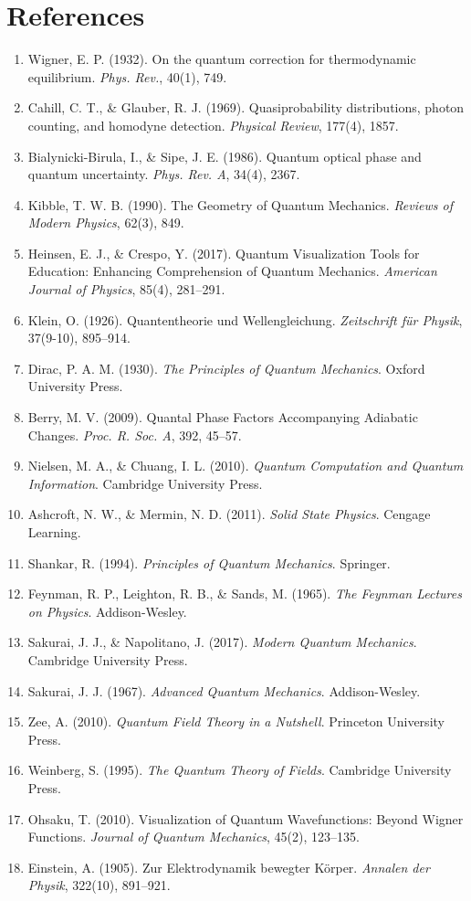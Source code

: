 \documentclass[12pt]{article}
\begin{document}
\section*{References}
\begin{enumerate}
    \item Wigner, E. P. (1932). On the quantum correction for thermodynamic equilibrium. \textit{Phys. Rev.}, 40(1), 749.
    \item Cahill, C. T., \& Glauber, R. J. (1969). Quasiprobability distributions, photon counting, and homodyne detection. \textit{Physical Review}, 177(4), 1857.
    \item Bialynicki-Birula, I., \& Sipe, J. E. (1986). Quantum optical phase and quantum uncertainty. \textit{Phys. Rev. A}, 34(4), 2367.
    \item Kibble, T. W. B. (1990). The Geometry of Quantum Mechanics. \textit{Reviews of Modern Physics}, 62(3), 849.
    \item Heinsen, E. J., \& Crespo, Y. (2017). Quantum Visualization Tools for Education: Enhancing Comprehension of Quantum Mechanics. \textit{American Journal of Physics}, 85(4), 281–291.
    \item Klein, O. (1926). Quantentheorie und Wellengleichung. \textit{Zeitschrift für Physik}, 37(9-10), 895–914.
    \item Dirac, P. A. M. (1930). \textit{The Principles of Quantum Mechanics}. Oxford University Press.
    \item Berry, M. V. (2009). Quantal Phase Factors Accompanying Adiabatic Changes. \textit{Proc. R. Soc. A}, 392, 45–57.
    \item Nielsen, M. A., \& Chuang, I. L. (2010). \textit{Quantum Computation and Quantum Information}. Cambridge University Press.
    \item Ashcroft, N. W., \& Mermin, N. D. (2011). \textit{Solid State Physics}. Cengage Learning.
    \item Shankar, R. (1994). \textit{Principles of Quantum Mechanics}. Springer.
    \item Feynman, R. P., Leighton, R. B., \& Sands, M. (1965). \textit{The Feynman Lectures on Physics}. Addison-Wesley.
    \item Sakurai, J. J., \& Napolitano, J. (2017). \textit{Modern Quantum Mechanics}. Cambridge University Press.
    \item Sakurai, J. J. (1967). \textit{Advanced Quantum Mechanics}. Addison-Wesley.
    \item Zee, A. (2010). \textit{Quantum Field Theory in a Nutshell}. Princeton University Press.
    \item Weinberg, S. (1995). \textit{The Quantum Theory of Fields}. Cambridge University Press.
    \item Ohsaku, T. (2010). Visualization of Quantum Wavefunctions: Beyond Wigner Functions. \textit{Journal of Quantum Mechanics}, 45(2), 123–135.
    \item Einstein, A. (1905). Zur Elektrodynamik bewegter Körper. \textit{Annalen der Physik}, 322(10), 891–921.
\end{enumerate}
\end{document}

